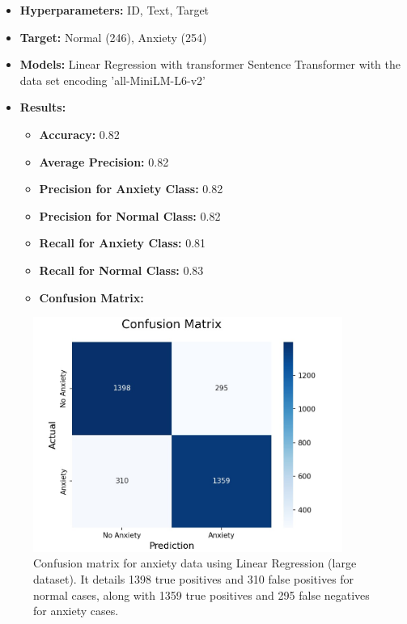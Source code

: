 \documentclass[runningheads,a4paper,11pt]{report}
\begin{document}
\begin{itemize}
    \item \textbf{Hyperparameters:} ID, Text, Target
    \item \textbf{Target:} Normal (246), Anxiety (254)
    \item \textbf{Models:} Linear Regression with transformer Sentence Transformer with the data set encoding 'all-MiniLM-L6-v2'
    \item \textbf{Results:}
    \begin{itemize}
        \item \textbf{Accuracy:} 0.82
        \item \textbf{Average Precision:} 0.82
        \item \textbf{Precision for Anxiety Class:} 0.82
        \item \textbf{Precision for Normal Class:} 0.82
        \item \textbf{Recall for Anxiety Class:} 0.81
        \item \textbf{Recall for Normal Class:} 0.83
        \item \textbf{Confusion Matrix:}
    \end{itemize}
\end{itemize}

\begin{figure}[h]
\centering
\includegraphics[width=0.9\textwidth]{Anxiety-Data-LinearRegression.jpg}
\caption[Confusion matrix for anxiety data (linear regression)]{\centering Confusion matrix for anxiety data using Linear Regression (large dataset). It details 1398 true positives and 310 false positives for normal cases, along with 1359 true positives and 295 false negatives for anxiety cases.}
\end{figure}
\end{document}
